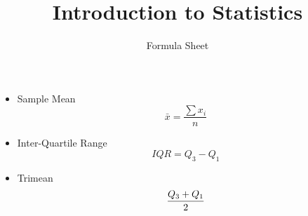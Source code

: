 \documentclass[12pt]{article}
\title{Introduction to Statistics}
\author{Formula Sheet}
\begin{document}
\maketitle

\begin{itemize}
\item Sample Mean
\[\bar{x} = \frac{\sum x_i}{n}\]


\item Inter-Quartile Range
\[IQR = Q_3 - Q_1 \]

\item Trimean
\[ {Q_3 + Q_1 \over 2 } \]
\end{itemize}
\end{document}
